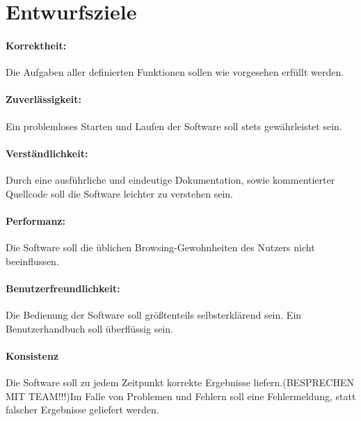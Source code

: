 \documentclass[11pt]{scrreprt}
\begin{document}
\section{Entwurfsziele}
\paragraph{Korrektheit:} Die Aufgaben aller definierten Funktionen sollen wie vorgesehen erfüllt werden.

\paragraph{Zuverlässigkeit:} Ein problemloses Starten und Laufen der Software soll stets gewährleistet sein.

\paragraph{Verständlichkeit:} Durch eine ausführliche und eindeutige Dokumentation, sowie kommentierter Quellcode soll die Software leichter zu verstehen sein.

\paragraph{Performanz:} Die Software soll die üblichen Browsing-Gewohnheiten des Nutzers nicht beeinflussen.

\paragraph{Benutzerfreundlichkeit:} Die Bedienung der Software soll größtenteils selbsterklärend sein. Ein Benutzerhandbuch soll überflüssig sein.

\paragraph{Konsistenz} Die Software soll zu jedem Zeitpunkt korrekte Ergebnisse liefern.(BESPRECHEN MIT TEAM!!!)Im Falle von Problemen und Fehlern soll eine Fehlermeldung, statt falscher Ergebnisse geliefert werden.
\end{document}
